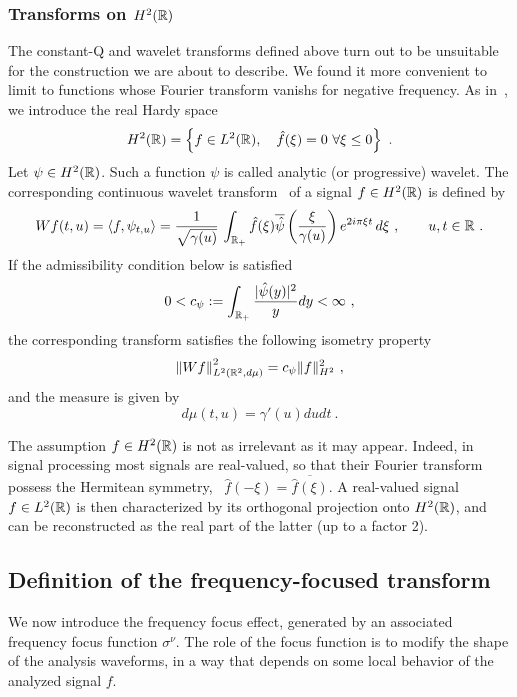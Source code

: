 \subsubsection{Transforms on $H^2(\mathbb{R})$}
The constant-Q and wavelet transforms defined above turn out to be unsuitable for the construction we are about to describe. We found it more convenient to limit to functions whose Fourier transform vanishs for negative frequency. As in~\cite{Grossmann1984decomposition}, we introduce the real Hardy space
\begin{equation}
\label{es_real_hardy_space}
H^2(\mathbb{R}) = \left\{ f\in L^2(\mathbb{R}),\quad \hat f(\xi)=0\ \forall\xi\le 0\right\}\ .
\end{equation}
Let $\psi\in H^2(\mathbb{R})$. Such a function $\psi$ is called analytic (or progressive) wavelet. The corresponding continuous wavelet transform~\cite{Grossmann1984decomposition} of a signal $f\in H^2(\mathbb{R})$ is defined by
\begin{equation}
Wf(t,u) = \langle f,\psi_{t,u}\rangle = \frac{1}{\sqrt{\gamma(u)}}\,\int_{\mathbb{R}_+} \hat f(\xi)\overline{\hat\psi}\left(\frac{\xi}{\gamma(u)}\right) e^{2i\pi \xi t}\,d\xi\ ,\qquad u,t\in\mathbb{R}\ .
\end{equation} 
If the admissibility condition below is satisfied
\begin{equation}
\label{fo:CWT.admissibility.H2}
0<c_\psi := \int_{\R_+}\frac{|\hat{\psi}(y)|^2}{y}dy <\infty\ ,
\end{equation}
the corresponding transform satisfies the following isometry property
\begin{equation}
\left\|W f\right\|_{L^2(\mathbb{R}^2,d\mu)}^2 = c_\psi \|f\|^2_{H^2}\ ,
\end{equation}
and the measure is given by
\begin{equation}
d\mu(t,u) = \gamma'(u) du dt\ .
\end{equation}
\begin{remark}
The assumption $f\in H^2(\mathbb{R})$ is not as irrelevant as it may appear. Indeed, in signal processing most signals are real-valued, so that their Fourier transform possess the Hermitean symmetry, \ie\, $\hat f(-\xi)=\overline{\hat f(\xi)}$. A real-valued signal $f\in L^2(\mathbb{R})$ is then characterized by its orthogonal projection onto $H^2(\mathbb{R})$, and can be reconstructed as the real part of the latter (up to a factor 2).
\end{remark}
\subsection{Definition of the frequency-focused transform}
\label{ssec:def.FFTFT}
We now introduce the frequency focus effect, generated by an associated frequency focus function $\sigma^\nu$. The role of the focus function is to modify the shape of the analysis waveforms, in a way that depends on some local behavior of the analyzed signal $f$. 

